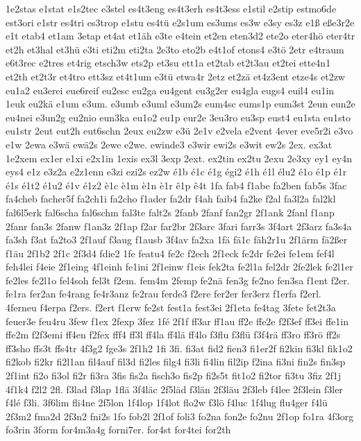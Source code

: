 {1e2stas
e1stat
e1s2tec
e3stel
es4t3eng
es4t3erh
es4t3ess
e1stil
e2stip
estmo6de
est3ori
e1str
es4tri
es3trop
e1stu
es4tü
e2s1um
es3ums
es3w
e3sy
es3z
e1ß
eße3r2e
e1t
etab4
et1am
3etap
et4at
et1äh
e3te
e4tein
et2en
eten3d2
ete2o
eter4hö
eter4tr
et2h
et3hal
et3hü
e3ti
eti2m
eti2ta
2e3to
eto2b
e4t1of
etons4
e3tö
2etr
e4traum
e6t3rec
e2tres
et4rig
etsch3w
ets2p
et3su
ett1a
et2tab
et2t3au
et2tei
ette4n1
et2th
et2t3r
et4tro
ett3sz
et4t1um
e3tü
etwa4r
2etz
et2zä
et4z3ent
etze4s
et2zw
eu1a2
eu3erei
eue6reif
eu2esc
eu2ga
eu4gent
eu3g2er
eu4gla
eugs4
euil4
eu1in
1euk
eu2kä
e1um
e3um.
e3umb
e3uml
e3um2s
eum4sc
eums1p
eum3st
2eun
eun2e
eu4nei
e3un2g
eu2nio
eun3ka
eu1o2
eu1p
eur2e
3eu3ro
eu3sp
eust4
eu1sta
eu1sto
eu1str
2eut
eut2h
eut6schn
2eux
eu2zw
e3ü
2e1v
e2vela
e2vent
4ever
eve5r2i
e3vo
e1w
2ewa
e3wä
ewä2s
2ewe
e2we.
ewinde3
e3wir
ewi2s
e3wit
ew2s
2ex.
ex3at
1e2xem
ex1er
e1xi
e2x1in
1exis
ex3l
3exp
2ext.
ex2tin
ex2tu
2exu
2e3xy
ey1
ey4n
eys4
e1z
e3z2a
e2z1enn
e3zi
ezi2s
ez2w
é1b
é1c
é1g
égi2
é1h
é1l
élu2
é1o
é1p
é1r
é1s
é1t2
é1u2
é1v
é1z2
è1c
è1m
è1n
è1r
ê1p
ê4t
1fa
fab4
f1abe
fa2ben
fab5s
3fac
fa4cheb
facher5f
fa2ch1i
fa2cho
f1ader
fa2dr
f4ah
faib4
fa2ke
f2al
fa3l2a
fal2kl
fal6l5erk
fal6scha
fal6schm
fal3te
falt2s
2fanb
2fanf
fan2gr
2f1ank
2fanl
f1anp
2fanr
fan3s
2fanw
f1an3z
2f1ap
f2ar
far2br
2f3arc
3fari
farr3s
3f4art
2f3arz
fa3s4a
fa3sh
f3at
fa2to3
2f1auf
f3aug
f1ausb
3f4av
fa2xa
1fä
fä1c
fäh2r1u
2f1ärm
fä2ßer
f1äu
2f1b2
2f1c
2f3d4
fdie2
1fe
featu4
fe2c
f2ech
2f1eck
fe2dr
fe2ei
fe1em
fef4l
feh4lei
f4eie
2f1eing
4f1einh
fe1ini
2f1einw
f1eis
fek2ta
fe2l1a
fel2dr
2fe2lek
fe2l1er
fe2les
fe2l1o
fel4soh
fel3t
f2em.
fem4m
2femp
fe2nä
fen3g
fe2no
fen3sa
f1ent
f2er.
fe1ra
fer2an
fe4rang
fe4r3anz
fe2rau
ferde3
f2ere
fer2er
fer3erz
f1erfa
f2erl.
4ferneu
f4erpa
f2ers.
f2ert
f1erw
fe2st
fest1a
fest3ei
2f1eta
fe4tag
3fete
fet2t3a
feuer3e
feu4ru
3few
f1ex
2fexp
3fez
1fé
2f1f
ff3ar
ff1au
ff2e
ffe2e
f2f3ef
ff3ei
ffe1in
ffe2m
f2f3emi
ff4en
f2fex
fff4
ff3l
ff4la
ff4lä
ff4lo
f3flu
f3flü
f3f4rä
ff3ro
ff3rö
ff2s
ff3sho
ffs3t
ffs4tr
4f3g2
fge3s
2f1h2
1fi
3fi.
fi3at
fid2
fien3
fi1er2f
fi2kin
fi3kl
fik1o2
fi2kob
fi2kr
fi2l1an
fil4auf
fil3d
fi2les
filg4
fi3li
fi4lin
fil2ip
f2ina
fi3ni
fin2s
fin3sp
2f1int
fi2o
fi3ol
fi2r
fi3ra
3fis
fis2a
fisch3o
fis2p
fi2s5t
fit1o2
fi2tor
fi3tu
3fiz
2f1j
4f1k4
f2l2
2fl.
f3lad
f3lap
1flä
3f4läc
2f5läd
f3län
2f3läu
2f3leb
f4lee
2f3lein
f3ler
f4lé
f3li.
3f6lim
fli4ne
2f5lon
1f4lop
1f4lot
flo2w
f3lö
f4luc
1f4lug
flu4ger
f4lü
2f3m2
fma2d
2f3n2
fni2s
1fo
fob2l
2f1of
foli3
fo2na
fon2e
fo2nu
2f1op
fo1ra
4f3org
fo3rin
3form
for4m3a4g
forni7er.
for4st
for4tei
for2th
}

